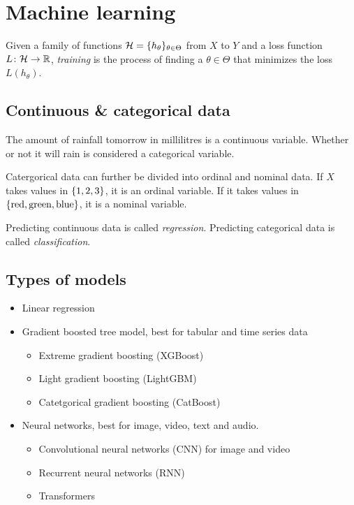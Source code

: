 \chapter{Machine learning} \label{chp:ml}

\begin{definition}[Training] \label{def:ml:training}
    Given a family of functions $\mathcal{H} = \{h_\theta\}_{\theta \in \Theta}$
    from $X$ to $Y$ and a loss function $L\colon \mathcal{H} \to \mathbb{R}$,
    \emph{training} is the process of finding a $\theta \in \Theta$
    that minimizes the loss $L(h_\theta)$.
\end{definition}

\section{Continuous \& categorical data} \label{sec:ml:cont-cat}
The amount of rainfall tomorrow in millilitres is a continuous variable.
Whether or not it will rain is considered a categorical variable.

Catergorical data can further be divided into ordinal and nominal data.
If $X$ takes values in $\{1, 2, 3\}$, it is an ordinal variable.
If it takes values in $\{\text{red}, \text{green}, \text{blue}\}$,
it is a nominal variable.

Predicting continuous data is called \emph{regression}.
Predicting categorical data is called \emph{classification}.

\section{Types of models} \label{sec:ml:models}
\begin{itemize}
    \item Linear regression
    \item Gradient boosted tree model, best for tabular and time series data
    \begin{itemize}
        \item Extreme gradient boosting (XGBoost)
        \item Light gradient boosting (LightGBM)
        \item Catetgorical gradient boosting (CatBoost)
    \end{itemize}
    \item Neural networks, best for image, video, text and audio.
    \begin{itemize}
        \item Convolutional neural networks (CNN) for image and video
        \item Recurrent neural networks (RNN)
        \item Transformers
    \end{itemize}
\end{itemize}

